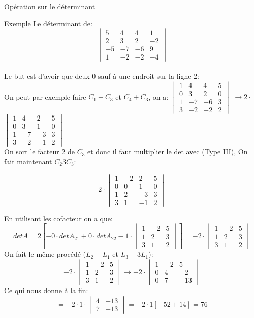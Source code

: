 \begin{parag}{Opération sur le déterminant}
\begin{subparag}{Exemple}
Le déterminant  de:
\[\begin{vmatrix}
5 & 4 & 4 & 1\\
2 & 3 & 2 & -2 \\
-5 & -7 & -6 & 9 \\
1 & -2 & -2 & -4
\end{vmatrix}\]
\\
Le but est d'avoir que deux 0 sauf à une endroit sur la ligne 2:
\\
On peut par exemple faire $C_1 - C_3$ et $C_4 + C_3$, on a:
$\begin{vmatrix}
1 & 4 & 4 & 5\\
0 & 3 & 2 & 0 \\
1 & -7 & -6 & 3 \\
3 & -2 & -2 & 2
\end{vmatrix}$ $\to 2\cdot$ $\begin{vmatrix} 
1 & 4 & 2 & 5\\
0 & 3 & 1 & 0 \\
1 & -7 & -3 & 3 \\
3 & -2 & -1 & 2
\end{vmatrix}$
\\
On sort le facteur 2 de $C_3$ et donc il faut multiplier le det avec (Type III), On fait maintenant $C_2 3C_3$:

 \[2\cdot\begin{vmatrix} 
1 & -2 & 2 & 5\\
0 & 0 & 1 & 0 \\
1 & 2 & -3 & 3 \\
3 & 1 & -1 & 2
\end{vmatrix}\]

En utilisant les cofacteur on a que:
\[ det A = 2[-0\cdot detA_{21} + 0\cdot detA_{22} -1\cdot \begin{vmatrix} 
1 & -2 & 5\\
1 & 2  & 3 \\
3 & 1  & 2
\end{vmatrix}] = -2\cdot\begin{vmatrix} 
1 & -2 & 5\\
1 & 2  & 3 \\
3 & 1  & 2
\end{vmatrix}\]
On fait le même procédé ($L_2 - L_1$ et $L_3 - 3L_1$):
\[ -2\cdot\begin{vmatrix} 
1 & -2 & 5\\
1 & 2  & 3 \\
3 & 1  & 2
\end{vmatrix} \to -2\cdot\begin{vmatrix} 
1 & -2 & 5\\
0 & 4  & -2 \\
0 & 7  & -13
\end{vmatrix}\]
Ce qui nous donne à la fin:
\[ = -2\cdot 1 \cdot \begin{vmatrix}
    4 & -13 \\
    7 & -13
\end{vmatrix} = -2\cdot 1 [-52 + 14] = 76\]



    
\end{subparag}
\end{parag}
